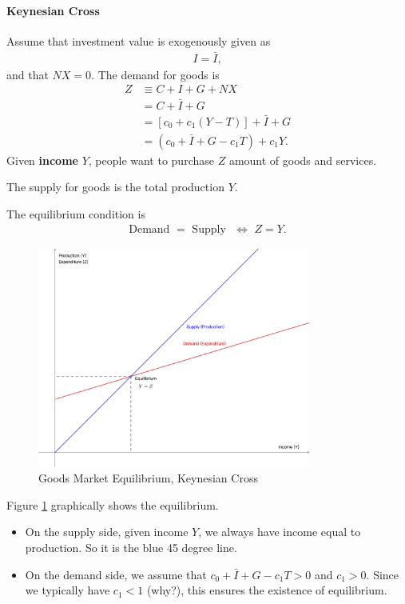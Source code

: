 \documentclass[12pt]{article}
\numberwithin{equation}{section}
\begin{document}
\paragraph{Keynesian Cross}
Assume that investment value is exogenously given as
\begin{align*}
    I = \bar{I},
\end{align*}
and that $NX=0$. 
The demand for goods is
\begin{align}\label{eq:demand_v1}
    Z &\equiv C + I + G + NX\\
    &= C + \bar{I} + G\\
    &= [c_0 + c_1(Y-T)] + \bar{I} + G\\
    &= (c_0 + \bar{I} + G - c_1T) + c_1Y.
\end{align}
Given \textbf{income} $Y$, people want to purchase $Z$ amount of goods and services.

The supply for goods is the total production $Y$. 

The equilibrium condition is
\begin{align}\label{eq:eqm_cond}
    \text{Demand } = \text{ Supply }\,\, \iff \,\, Z = Y.
\end{align}

\begin{figure}[htp]
    \centering
    \includegraphics[width=0.8\textwidth]{keynesian_cross_0.png}
    \caption{Goods Market Equilibrium, Keynesian Cross}
    \label{fig:key_cross_v1}
\end{figure}

Figure \ref{fig:key_cross_v1} graphically shows the equilibrium. 
\begin{itemize}
    \item On the supply side, given income $Y$, we always have income equal to production. So it is the blue 45 degree line.
    \item On the demand side, we assume that $c_0 + \bar{I} + G - c_1T > 0$ and $c_1 > 0$. Since we typically have $c_1<1$ (why?), this ensures the existence of equilibrium.
\end{itemize}
\end{document}
